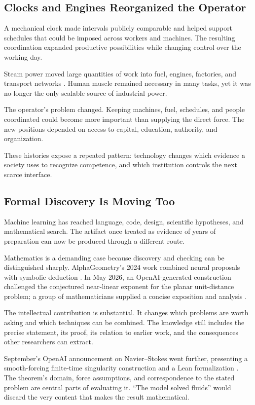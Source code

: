 \documentclass[11pt,openany]{book}
\begin{document}
\subsection{Clocks and Engines Reorganized the Operator}

A mechanical clock made intervals publicly comparable and helped support schedules that could be imposed across workers and machines. The resulting coordination expanded productive possibilities while changing control over the working day.

Steam power moved large quantities of work into fuel, engines, factories, and transport networks \cite{landes1969unbound}. Human muscle remained necessary in many tasks, yet it was no longer the only scalable source of industrial power.

The operator's problem changed. Keeping machines, fuel, schedules, and people coordinated could become more important than supplying the direct force. The new positions depended on access to capital, education, authority, and organization.

These histories expose a repeated pattern: technology changes which evidence a society uses to recognize competence, and which institution controls the next scarce interface.

\subsection{Formal Discovery Is Moving Too}

Machine learning has reached language, code, design, scientific hypotheses, and mathematical search. The artifact once treated as evidence of years of preparation can now be produced through a different route.

Mathematics is a demanding case because discovery and checking can be distinguished sharply. AlphaGeometry's 2024 work combined neural proposals with symbolic deduction \cite{trinh2024alphageometry}. In May 2026, an OpenAI-generated construction challenged the conjectured near-linear exponent for the planar unit-distance problem; a group of mathematicians supplied a concise exposition and analysis \cite{alon2026remarks}.

The intellectual contribution is substantial. It changes which problems are worth asking and which techniques can be combined. The knowledge still includes the precise statement, its proof, its relation to earlier work, and the consequences other researchers can extract.

September's OpenAI announcement on Navier--Stokes went further, presenting a smooth-forcing finite-time singularity construction and a Lean formalization \cite{openai2026navierstokes}. The theorem's domain, force assumptions, and correspondence to the stated problem are central parts of evaluating it. “The model solved fluids” would discard the very content that makes the result mathematical.
\end{document}
